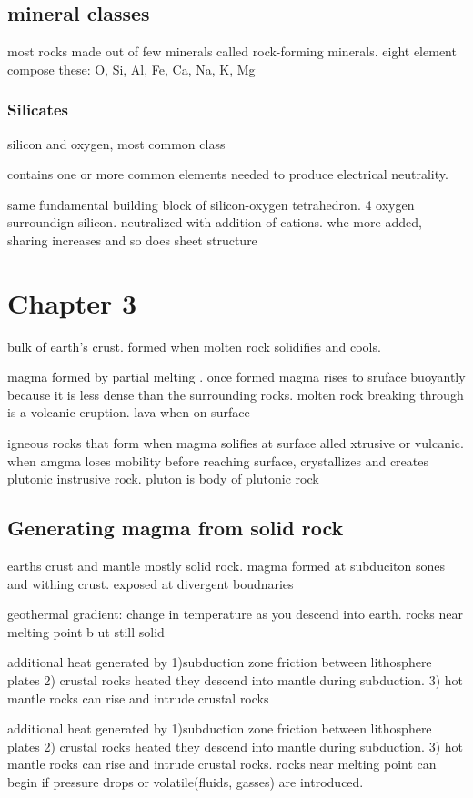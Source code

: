 \documentclass[11pt]{amsart}
\begin{document}
  \subsection{mineral classes}
  \par most rocks made out of few minerals called rock-forming minerals.
  eight element compose these: O, Si, Al, Fe, Ca, Na, K, Mg
  \subsubsection{Silicates}
  \par silicon and oxygen, most common class
  \par contains one or more common elements needed to produce electrical
  neutrality.
  \par same fundamental building block of silicon-oxygen tetrahedron. 4
  oxygen surroundign silicon. neutralized with addition of cations. whe more
  added, sharing increases and so does sheet structure
  \section{Chapter 3}
  \par bulk of earth's crust. formed when molten rock solidifies and cools.
  \par magma formed by partial melting . once formed magma rises to sruface
  buoyantly because it is less dense than the surrounding rocks. molten
  rock breaking through is a volcanic eruption. lava when on surface
  \par igneous rocks that form when magma solifies at surface alled
  xtrusive or vulcanic. when amgma loses mobility before reaching
  surface, crystallizes and creates plutonic instrusive rock. pluton is body
  of plutonic rock
  \subsection{Generating magma from solid rock}
  \par earths crust and mantle mostly solid rock. magma formed at
  subduciton sones and withing crust. exposed at divergent boudnaries
  \par geothermal gradient: change in temperature as you descend into earth.
  rocks near melting point b ut still solid
  \par additional heat generated by 1)subduction zone friction between
  lithosphere plates 2) crustal rocks heated they descend into mantle during
  subduction. 3) hot mantle rocks can rise and intrude crustal rocks
  \par additional heat generated by 1)subduction zone friction between
  lithosphere plates 2) crustal rocks heated they descend into mantle during
  subduction. 3) hot mantle rocks can rise and intrude crustal rocks. rocks
  near melting point can begin if pressure drops or volatile(fluids, gasses)
  are introduced.
\end{document}
